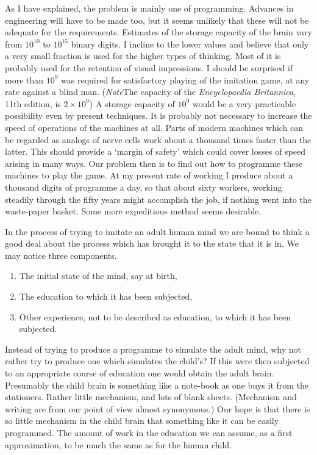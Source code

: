 \documentclass[10pt]{article} %
\begin{document}
As I have explained, the problem is mainly one of programming. Advances in engineering will have to be made too, but it seems unlikely that these will not be adequate for the requirements. Estimates of the storage capacity of the brain vary from $10^{10}$ to $10^{15}$ binary digits. I incline to the lower values and believe that only a very small fraction is used for the higher types of thinking. Most of it is probably used for the retention of visual impressions. I should be surprised if more than $10^9$ was required for satisfactory playing of the imitation game, at any rate against a blind man. (\textit{Note}\textemdash The capacity of the \textit{Encyclopaedia Britannica}, 11th edition, is $2 \times 10^9$) A storage capacity of $10^9$ would be a very practicable possibility even by present techniques. It is probably not necessary to increase the speed of operations of the machines at all. Parts of modern machines which can be regarded as analogs of nerve cells work about a thousand times faster than the latter. This should provide a `margin of safety' which could cover losses of speed arising in many ways. Our problem then is to find out how to programme these machines to play the game. At my present rate of working I produce about a thousand digits of programme a day, so that about sixty workers, working steadily through the fifty years might accomplish the job, if nothing went into the waste-paper basket. Some more expeditious method seems desirable.

In the process of trying to imitate an adult human mind we are bound to think a good deal about the process which has brought it to the state that it is in. We may notice three components.
\begin{enumerate}[label=(\alph*),itemsep=0pt] %
    \item The initial state of the mind, say at birth,
    \item The education to which it has been subjected,
    \item Other experience, not to be described as education, to which it has been subjected.
\end{enumerate}

Instead of trying to produce a programme to simulate the adult mind, why not rather try to produce one which simulates the child's? If this were then subjected to an appropriate course of education one would obtain the adult brain. Presumably the child brain is something like a note-book as one buys it from the stationers. Rather little mechanism, and lots of blank sheets. (Mechanism and writing are from our point of view almost synonymous.) Our hope is that there is so little mechanism in the child brain that something like it can be easily programmed. The amount of work in the education we can assume, as a first approximation, to be much the same as for the human child.
\end{document}
